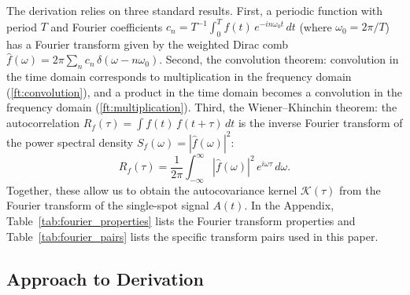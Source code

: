 \documentclass[preprint]{aastex702}
\newcommand{\FT}[1]{\hat{#1}}
\begin{document}


The derivation relies on three standard results. First, a periodic function with period $T$ and Fourier coefficients $c_n = T^{-1}\int_0^T f(t)\,e^{-in\omega_0 t}\,dt$ (where $\omega_0 = 2\pi/T$) has a Fourier transform given by the weighted Dirac comb $\FT{f}(\omega) = 2\pi \sum_n c_n\,\delta(\omega - n\omega_0)$.
Second, the convolution theorem: convolution in the time domain corresponds to multiplication in the frequency domain (\ref{ft:convolution}), and a product in the time domain becomes a convolution in the frequency domain (\ref{ft:multiplication}).
Third, the Wiener--Khinchin theorem: the autocorrelation $R_f(\tau) = \int f(t)\,f(t+\tau)\,dt$ is the inverse Fourier transform of the power spectral density $S_f(\omega) = |\FT{f}(\omega)|^2$:
\begin{equation}
    R_f(\tau) = \frac{1}{2\pi}\int_{-\infty}^{\infty} |\FT{f}(\omega)|^2\, e^{i\omega\tau}\, d\omega.
    \label{eq:wk}
\end{equation}
Together, these allow us to obtain the autocovariance kernel $\mathcal{K}(\tau)$ from the Fourier transform of the single-spot signal $A(t)$. In the Appendix, Table~\ref{tab:fourier_properties} lists the Fourier transform properties and Table~\ref{tab:fourier_pairs} lists the specific transform pairs used in this paper.


\subsection{Approach to Derivation}
\end{document}
